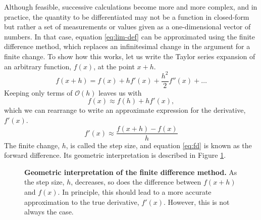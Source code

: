    Although feasible, successive calculations become more and more complex, and
    in practice, the quantity to be differentiated may not be a function in 
    closed-form but rather a set of measurements or values given as a 
    one-dimensional vector of numbers. In that case, equation \eqref{eq:lim-def}
    can be approximated using the finite difference method, which replaces an 
    infinitesimal change in the argument for a finite change. To show how this 
    works, let us write the Taylor series expansion of an arbitrary function, 
    $f(x)$, at the point $x+h$.
    \begin{equation}
        f(x+h) = f(x) + hf'(x) + \frac{h^2}{2}f''(x) + \dots
        \label{eq:f-tay}
    \end{equation}
    Keeping only terms of $\mathcal{O}(h)$ leaves us with
    \begin{equation}
        f(x) \approx f(h) + hf'(x),
    \end{equation}
    which we can rearrange to write an approximate expression for the derivative,
    $f'(x)$.
    \begin{equation}
        f'(x) \approx \frac{f(x+h)-f(x)}{h}
        \label{eq:fd}
    \end{equation}
    The finite change, $h$, is called the step size, and equation \eqref{eq:fd} 
    is known as the forward difference. Its geometric interpretation is 
    described in Figure \ref{fig:fd-schematic}.
    \begin{figure}[H]
        \centering
        \caption{\textbf{Geometric interpretation of the finite difference 
        method.} As the step size, $h$, decreases, so does the difference 
        between $f(x+h)$ and $f(x)$. In principle, this should lead to a more 
        accurate approximation to the true derivative, $f'(x)$. However, this is
        not always the case.}
        \label{fig:fd-schematic}
    \end{figure}
    
